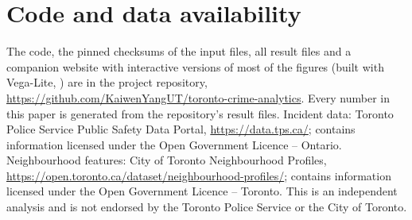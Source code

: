 \section*{Code and data availability}
\small
The code, the pinned checksums of the input files, all result files and a companion website with interactive versions of most of the figures (built with Vega-Lite, \citealt{satyanarayan2017vegalite}) are in the project repository, \url{https://github.com/KaiwenYangUT/toronto-crime-analytics}. Every number in this paper is generated from the repository's result files. Incident data: Toronto Police Service Public Safety Data Portal, \url{https://data.tps.ca/}; contains information licensed under the Open Government Licence -- Ontario. Neighbourhood features: City of Toronto Neighbourhood Profiles, \url{https://open.toronto.ca/dataset/neighbourhood-profiles/}; contains information licensed under the Open Government Licence -- Toronto. This is an independent analysis and is not endorsed by the Toronto Police Service or the City of Toronto.
